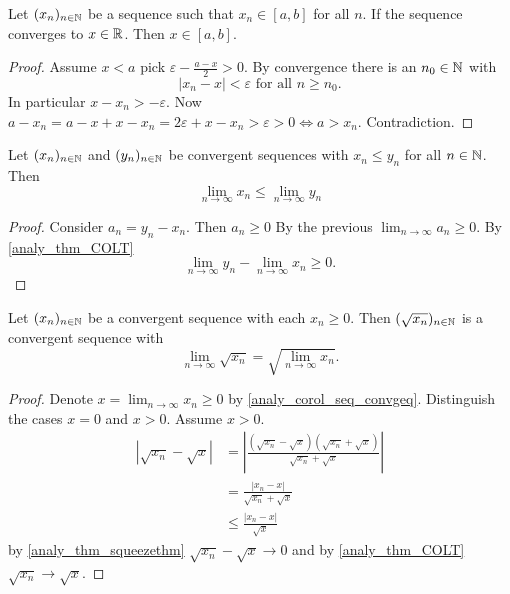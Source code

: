 \documentclass[10pt, a4paper]{article}
\newcommand{\seq}[1][x]{(#1_n)_{n \in \N}}
\begin{document}
\begin{theorem}\label{analy_thm_contofsqrt}
    Let $\seq$ be a sequence such that $x_n \in [a, b]$ for all $n$.
    If the sequence converges to $x \in \mathbb{R}$.
    Then $x \in [a, b]$.
    \begin{proof}
        Assume $x < a$ pick $\varepsilon - \frac{a - x}{2} > 0$.
        By convergence there is an $n_0 \in \mathbb{N}$ with
        \[
        |x_n - x| < \varepsilon \text{ for all } n \geq n_0.
        \]
        In particular
        $x - x_n > - \varepsilon$.
        Now $a - x_n = a - x + x - x_n = 2\varepsilon + x - x_n > \varepsilon > 0 \iff a > x_n$.
        Contradiction.
    \end{proof}
\end{theorem}

\begin{corollary}\label{analy_corol_seq_convgeq}
    Let $\seq$ and $\seq[y]$ be convergent sequences with $x_n \leq y_n$ for all $n \in \mathbb{N}$.
    Then
    \[
    \lim_{n \rightarrow \infty}x_n \leq \lim_{n \rightarrow \infty}y_n
    \]
    \begin{proof}
        Consider $a_n = y_n - x_n$.
        Then $a_n \geq 0$
        By the previous $\lim_{n \rightarrow \infty}a_n \geq 0$. By \autoref{analy_thm_COLT}
        \[
        \lim_{n \rightarrow \infty}y_n - \lim_{n \rightarrow \infty}x_n \geq 0.
        \]
    \end{proof}
\end{corollary}
\begin{theorem}
    Let $\seq$ be a convergent sequence with each $x_n \geq 0$.
    Then
    $(\sqrt{x_n})_{n \in \mathbb{N}}$ is a convergent sequence with
    \[
    \lim_{n \rightarrow \infty}\sqrt{x_n} = \sqrt{\lim_{n \rightarrow \infty}x_n}.
    \]
    \begin{proof}
        Denote $x = \lim_{n \rightarrow \infty}x_n \geq 0$ by \autoref{analy_corol_seq_convgeq}.
        Distinguish the cases $x = 0$ and $x > 0$.
        Assume $x > 0$.
        \begin{align*}
            |\sqrt{x_n} - \sqrt{x}| &= \left|\frac{(\sqrt{x_n} - \sqrt{x})(\sqrt{x_n} + \sqrt{x})}{\sqrt{x_n} + \sqrt{x}}\right| \\
            &= \frac{|x_n - x|}{\sqrt{x_n} + \sqrt{x}} \\
            &\leq \frac{|x_n - x|}{\sqrt{x}}
        \end{align*}
        by \autoref{analy_thm_squeezethm} $\sqrt{x_n} - \sqrt{x} \rightarrow 0$ and by \autoref{analy_thm_COLT} $\sqrt{x_n} \rightarrow \sqrt{x}$.
    \end{proof}
\end{theorem}
\end{document}
